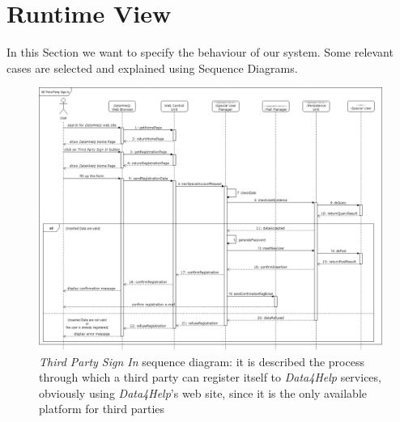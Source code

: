 \clearpage

\section{Runtime View}\label{runtimeViewSection}
In this Section we want to specify the behaviour of our system. Some relevant cases are selected and explained using Sequence Diagrams.

\begin{figure}[H]
  \begin{center}
  	\includegraphics[width=\textwidth]{./img/sequence/webSignIn.png}
    \hspace{0.05\linewidth}
    \centering
    \caption{\textit{Third Party Sign In} sequence diagram: it is described the process through which a third party can register itself to \textit{Data4Help} services, obviously using \textit{Data4Help}'s web site, since it is the only available platform for third parties}
		\label{img:webSignIn}
    \end{center}
\end{figure}


